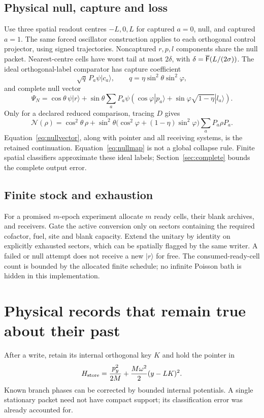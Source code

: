 \documentclass[11pt]{article}
\theoremstyle{definition}\newtheorem{assumption}[theorem]{Constitutive assumption}
\theoremstyle{remark}\newtheorem{remark}[theorem]{Remark}
\newcommand{\ket}[1]{|#1\rangle}\newcommand{\bra}[1]{\langle#1|}
\begin{document}
\subsection{Physical null, capture and loss}
Use three spatial readout centres $-L,0,L$ for captured $a=0$, null, and captured $a=1$. The same forced oscillator construction applies to each orthogonal control projector, using signed trajectories. Noncaptured $r,p,l$ components share the null packet. Nearest-centre cells have worst tail at most $2\delta$, with $\delta=\overline{\mathsf F}(L/(2\sigma))$. The ideal orthogonal-label comparator has capture coefficient
\[
 \sqrt q\,P_a\psi\ket{c_a},\qquad q=\eta\sin^2\theta\sin^2\varphi,
\]
and complete null vector
\begin{equation}\label{eq:nullvector}
 \Psi_N=\cos\theta\,\psi\ket r+
 \sin\theta\sum_aP_a\psi\left(\cos\varphi\ket{p_a}
                 +\sin\varphi\sqrt{1-\eta}\ket{l_a}\right).
\end{equation}
Only for a declared reduced comparison, tracing $D$ gives
\begin{equation}\label{eq:nullmap}
 \mathcal N(\rho)=\cos^2\theta\,\rho+
 \sin^2\theta\bigl(\cos^2\varphi+(1-\eta)\sin^2\varphi\bigr)
                  \sum_aP_a\rho P_a.
\end{equation}
Equation~\eqref{eq:nullvector}, along with pointer and all receiving systems, is the retained continuation. Equation~\eqref{eq:nullmap} is not a global collapse rule. Finite spatial classifiers approximate these ideal labels; Section~\ref{sec:complete} bounds the complete output error.

\subsection{Finite stock and exhaustion}
For a promised $m$-epoch experiment allocate $m$ ready cells, their blank archives, and receivers. Gate the active conversion only on sectors containing the required cofactor, fuel, site and blank capacity. Extend the unitary by identity on explicitly exhausted sectors, which can be spatially flagged by the same writer. A failed or null attempt does not receive a new $\ket r$ for free. The consumed-ready-cell count is bounded by the allocated finite schedule; no infinite Poisson bath is hidden in this implementation.

\section{Physical records that remain true about their past}
\label{sec:archive}
After a write, retain its internal orthogonal key $K$ and hold the pointer in
\begin{equation}\label{eq:store}
 H_{\rm store}=\frac{p_y^2}{2M}+\frac{M\omega^2}{2}(y-LK)^2.
\end{equation}
Known branch phases can be corrected by bounded internal potentials. A single stationary packet need not have compact support; its classification error was already accounted for.
\end{document}
